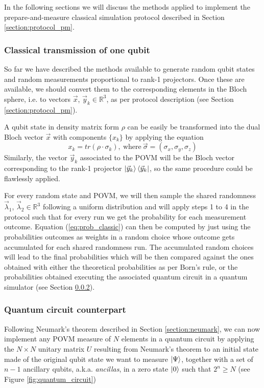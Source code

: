 In the following sections we will discuss the methods applied to implement the prepare-and-measure classical simulation protocol described in Section \ref{section:protocol_pm}.
\subsubsection{Classical transmission of one qubit}
So far we have described the methods available to generate random qubit states and random measurements proportional to rank-1 projectors. Once these are available, we should convert them to the corresponding elements in the Bloch sphere, i.e. to vectors $\vec{x}$, ${\vec{y}_k} \in \mathbb{R}^3$, as per protocol description (see Section \ref{section:protocol_pm}). 

A qubit state in density matrix form $\rho$ can be easily be transformed into the dual Bloch vector $\vec{x}$ with components $\{x_k\}$ by applying the equation
\begin{equation}
    x_k = tr(\rho \cdot \sigma_k),\ \text{where}\ \vec{\sigma} = (\sigma_x, \sigma_y, \sigma_z)
\end{equation}
Similarly, the vector ${\vec{y}_k}$ associated to the POVM will be the Bloch vector corresponding to the rank-1 projector $ \ket{\vec{y}_k} \bra{\vec{y}_k}$, so the same procedure could be flawlessly applied.

For every random state and POVM, we will then sample the shared randomness $\vec{\lambda}_1$, $\vec{\lambda}_2 \in \mathbb{R}^3$ following a uniform distribution and will apply steps 1 to 4 in the protocol such that for every run we get the probability for each measurement outcome. Equation (\ref{eq:prob_classic}) can then be computed by just using the probabilities outcomes as weights in a random choice whose outcome gets accumulated for each shared randomness run. The accumulated random choices will lead to the final probabilities which will be then compared against the ones obtained with either the theoretical probabilities as per Born's rule, or the probabilities obtained executing the associated quantum circuit in a quantum simulator (see Section \ref{section:quantum_circuit}).

\subsubsection{Quantum circuit counterpart}\label{section:quantum_circuit}
Following Neumark's theorem described in Section \ref{section:neumark}, we can now implement any POVM measure of $N$ elements in a quantum circuit by applying the $N\times N$ unitary matrix $U$ resulting from Neumark's theorem to an initial state made of the original qubit state we want to measure $\ket{\Psi}$, together with a set of $n-1$ ancillary qubits, a.k.a. \textit{ancillas}, in a zero state $\ket{0}$ such that $2^n \ge N$ (see Figure \ref{fig:quantum_circuit}) 

